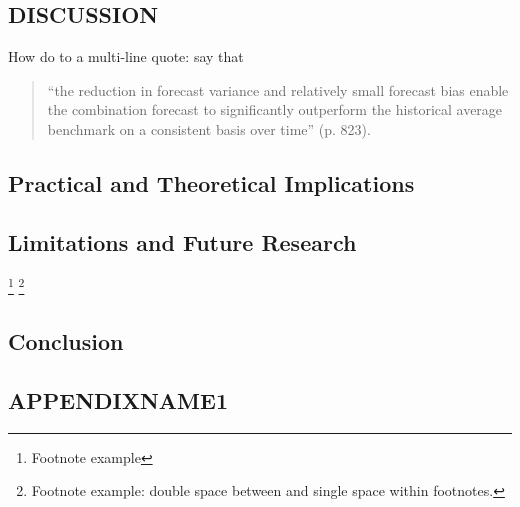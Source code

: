 \documentclass[12pt]{report}
\begin{document}
\begin{mainf}
\lipsum[3] 

\chapter{DISCUSSION}

\lipsum[2]

How do to a multi-line quote: \cite{rapach2010out} say that
\begin{singlespacing}
    \begin{quote}
        ``the reduction in forecast variance and relatively
small forecast bias enable the combination forecast to significantly outperform the historical average benchmark on a consistent basis over time'' (p. 823).
    \end{quote}
\end{singlespacing}

\lipsum[2]


\section{Practical and Theoretical Implications}

\lipsum[4]
 

\section{Limitations and Future Research}

\lipsum[4] \footnote{Footnote example \lipsum[1]}  \footnote{Footnote example: double space between and single space within footnotes. \lipsum[1]}

\section{Conclusion}

\lipsum[4]

\end{mainf}


\begin{bibliof}

\end{bibliof}


\begin{append}
\chapter{\MakeUppercase{AppendixName1}}

\lipsum[2-4]

\end{append}
\end{document}
